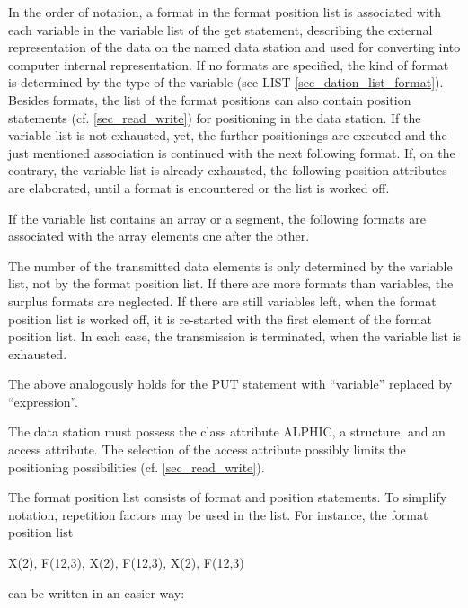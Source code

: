 In the order of notation, a format in the format position list is
associated with each variable in the variable list of the get
statement, describing the external representation of the data on the
named data station and used for converting into computer internal
representation. 
If no formats are specified, the kind of format is determined by the
type of the variable (see LIST \ref{sec_dation_list_format}).
Besides formats, the list of the format positions can also
contain position statements (cf. \ref{sec_read_write})
for positioning in the data
station. If the variable list is not exhausted, yet, the further
positionings are executed and the just mentioned association is
continued with the next following format. If, on the contrary, the
variable list is already exhausted, the following position attributes
are elaborated, until a format is encountered or the list is worked off.

If the variable list contains an array or a segment, the following
formats are associated with the array elements one after the other.

The number of the transmitted data elements is only determined by the
variable list, not by the format position list. If there are more
formats than variables, the surplus formats are neglected. If there are
still variables left, when the format position list is worked off, it is
re-started with the first element of the format position list. In each
case, the transmission is terminated, when the variable list is
exhausted.

The above analogously holds for the PUT statement with ``variable''
replaced by ``expression''.

The data station must possess the class attribute ALPHIC, a structure,
and an access attribute. The selection of the access attribute possibly
limits the positioning possibilities (cf. \ref{sec_read_write}).

The format position list consists of format and position statements.
To simplify notation, repetition factors may be used in the list. For
instance, the format position list

X(2), F(12,3), X(2), F(12,3), X(2), F(12,3)

can be written in an easier way:

